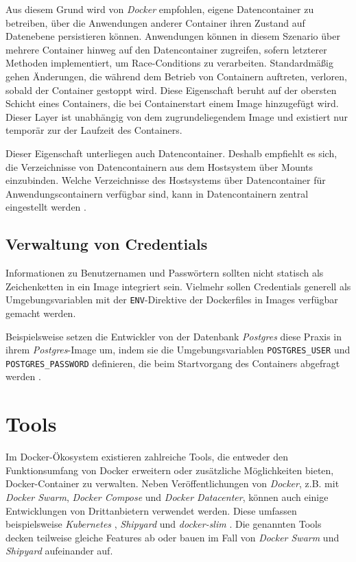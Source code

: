 \documentclass[../main.tex]{subfiles}
\begin{document}
      Aus diesem Grund wird von \emph{Docker} empfohlen, eigene Datencontainer zu betreiben, über die Anwendungen anderer Container ihren Zustand auf Datenebene persistieren können. Anwendungen können in diesem Szenario über mehrere Container hinweg auf den Datencontainer zugreifen, sofern letzterer Methoden implementiert, um Race-Conditions zu verarbeiten. Standardmäßig gehen Änderungen, die während dem Betrieb von Containern auftreten, verloren, sobald der Container gestoppt wird. Diese Eigenschaft beruht auf der obersten Schicht eines Containers, die bei Containerstart einem Image hinzugefügt wird. Dieser Layer ist unabhängig von dem zugrundeliegendem Image und existiert nur temporär zur der Laufzeit des Containers.

      Dieser Eigenschaft unterliegen auch Datencontainer. Deshalb empfiehlt es sich, die Verzeichnisse von Datencontainern aus dem Hostsystem über Mounts einzubinden. Welche Verzeichnisse des Hostsystems über Datencontainer für Anwendungscontainern verfügbar sind, kann in Datencontainern zentral eingestellt werden \cite{dockerManageDataContainers}.


    \subsection{Verwaltung von Credentials}
      Informationen zu Benutzernamen und Passwörtern sollten nicht statisch als Zeichenketten in ein Image integriert sein. Vielmehr sollen Credentials generell als Umgebungsvariablen mit der \texttt{ENV}-Direktive der Dockerfiles in Images verfügbar gemacht werden.

      Beispielsweise setzen die Entwickler von der Datenbank \emph{Postgres} diese Praxis in ihrem \emph{Postgres}-Image um, indem sie die Umgebungsvariablen \texttt{POSTGRES\_USER} und \texttt{POSTGRES\_PASSWORD} definieren, die beim Startvorgang des Containers abgefragt werden \cite{dockerHubPostgres}\cite{githubPostgresCredentialCheck}.

  \section{Tools}
    Im Docker-Ökosystem existieren zahlreiche Tools, die entweder den Funktionsumfang von Docker erweitern oder zusätzliche Möglichkeiten bieten, Docker-Container zu verwalten. Neben Veröffentlichungen von \emph{Docker}, z.B. mit \emph{Docker Swarm}, \emph{Docker Compose} und \emph{Docker Datacenter}, können auch einige Entwicklungen von Drittanbietern verwendet werden. Diese umfassen beispielsweise \emph{Kubernetes} \cite{kubernetes}, \emph{Shipyard} \cite{kubernetes} und \emph{docker-slim} \cite{githubDockerSlim}. Die genannten Tools decken teilweise gleiche Features ab oder bauen im Fall von \emph{Docker Swarm} und \emph{Shipyard} aufeinander auf.
\end{document}
